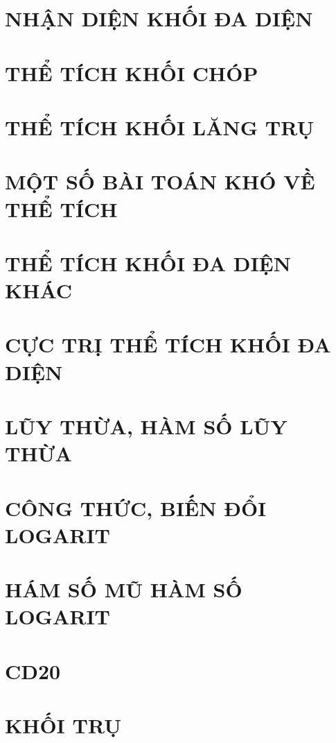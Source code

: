 \documentclass[12pt,a4paper,oneside]{extbook}
\theoremstyle{plain}
\theoremstyle{nonumberplain}
\begin{document}
\chapter{NHẬN DIỆN KHỐI ĐA DIỆN}

\chapter{THỂ TÍCH KHỐI CHÓP}


\chapter{THỂ TÍCH KHỐI LĂNG TRỤ}


\chapter{MỘT SỐ BÀI TOÁN KHÓ VỀ THỂ TÍCH}

\chapter{THỂ TÍCH KHỐI ĐA DIỆN KHÁC}



\chapter{CỰC TRỊ THỂ TÍCH KHỐI ĐA DIỆN}

\chapter{LŨY THỪA, HÀM SỐ LŨY THỪA}

\chapter{CÔNG THỨC, BIẾN ĐỔI LOGARIT}



\chapter{HÁM SỐ MŨ HÀM SỐ LOGARIT}



\chapter{CD20}



\chapter{KHỐI TRỤ}



\end{document}
